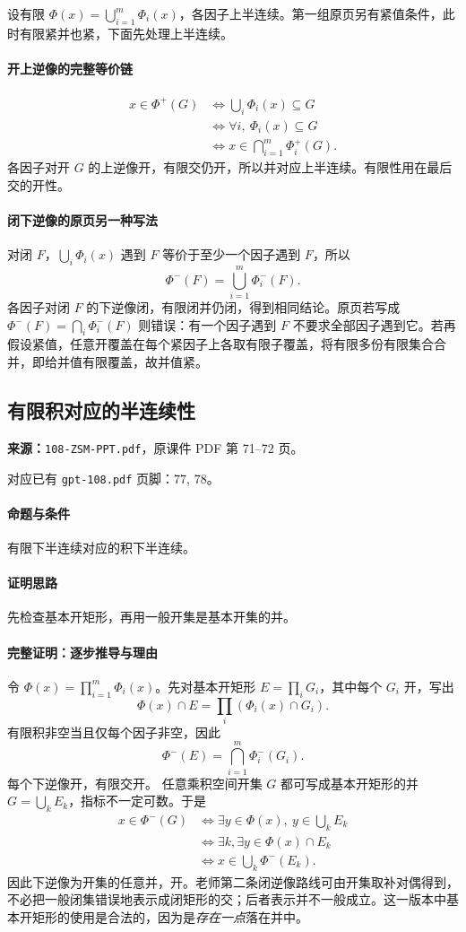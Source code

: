 设有限 $\Phi(x)=\bigcup_{i=1}^m\Phi_i(x)$，各因子上半连续。第一组原页另有紧值条件，此时有限紧并也紧，下面先处理上半连续。
\paragraph{开上逆像的完整等价链}
\begin{align*}
x\in\Phi^+(G)&\iff\bigcup_i\Phi_i(x)\subseteq G\\
&\iff\forall i,\ \Phi_i(x)\subseteq G\\
&\iff x\in\bigcap_{i=1}^m\Phi_i^+(G).
\end{align*}
各因子对开 $G$ 的上逆像开，有限交仍开，所以并对应上半连续。有限性用在最后交的开性。
\paragraph{闭下逆像的原页另一种写法}
对闭 $F$，$\bigcup_i\Phi_i(x)$ 遇到 $F$ 等价于至少一个因子遇到 $F$，所以
\[\Phi^-(F)=\bigcup_{i=1}^m\Phi_i^-(F).\]
各因子对闭 $F$ 的下逆像闭，有限闭并仍闭，得到相同结论。原页若写成 $\Phi^-(F)=\bigcap_i\Phi_i^-(F)$ 则错误：有一个因子遇到 $F$ 不要求全部因子遇到它。若再假设紧值，任意开覆盖在每个紧因子上各取有限子覆盖，将有限多份有限集合合并，即给并值有限覆盖，故并值紧。

\clearpage\subsection{有限积对应的半连续性}
\textbf{来源：}\texttt{108-ZSM-PPT.pdf}，原课件 PDF 第 71--72 页。\par
对应已有 \texttt{gpt-108.pdf} 页脚：77, 78。\par
\paragraph{命题与条件}有限下半连续对应的积下半连续。
\paragraph{证明思路}先检查基本开矩形，再用一般开集是基本开集的并。
\paragraph{完整证明：逐步推导与理由}

令 $\Phi(x)=\prod_{i=1}^m\Phi_i(x)$。先对基本开矩形 $E=\prod_iG_i$，其中每个 $G_i$ 开，写出
\[\Phi(x)\cap E=\prod_i(\Phi_i(x)\cap G_i).\]
有限积非空当且仅每个因子非空，因此
\[\Phi^-(E)=\bigcap_{i=1}^m\Phi_i^-(G_i).\]
每个下逆像开，有限交开。
任意乘积空间开集 $G$ 都可写成基本开矩形的并 $G=\bigcup_kE_k$，指标不一定可数。于是
\begin{align*}
x\in\Phi^-(G)&\iff\exists y\in\Phi(x),\ y\in\bigcup_kE_k\\
&\iff\exists k,\exists y\in\Phi(x)\cap E_k\\
&\iff x\in\bigcup_k\Phi^-(E_k).
\end{align*}
因此下逆像为开集的任意并，开。老师第二条闭逆像路线可由开集取补对偶得到，不必把一般闭集错误地表示成闭矩形的交；后者表示并不一般成立。这一版本中基本开矩形的使用是合法的，因为是\emph{存在一点}落在并中。


